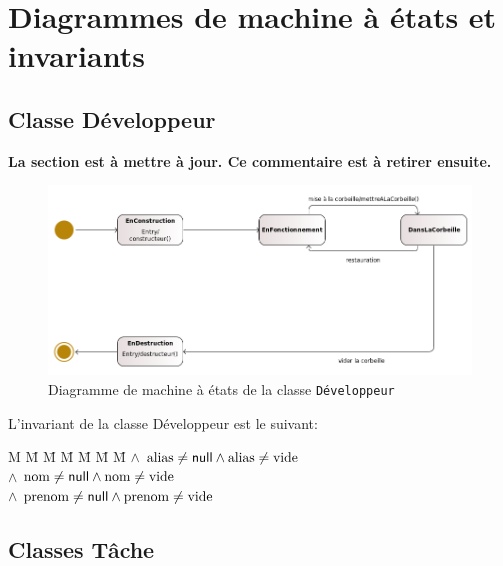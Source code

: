 \documentclass[11pt,article]{article}
\newcommand{\nullvalue}{\textsf{null}\xspace}
\begin{document}
\newpage

\section{Diagrammes de machine à états et invariants}

\subsection{Classe \textsf{Développeur}}

{\noindent\color{red}\textbf{La section est à mettre à jour. Ce
    commentaire est à retirer ensuite.}}

\begin{figure}[ht!]
\begin{center}
\includegraphics[scale=0.5]{./Diagrammes/suipro_uml_diag_machine_a_etats_developpeur}
\caption{Diagramme de machine à états de la classe \texttt{Développeur}}
\end{center}
\label{umlet_diag_machine_a_etats_developpeur}
\end{figure}

\newcommand{\emptystring}{\ensuremath\mathrm{vide}}
\newcommand{\alias}{\ensuremath\mathrm{alias}}
\newcommand{\nom}{\ensuremath\mathrm{nom}}
\newcommand{\prenom}{\ensuremath\mathrm{prenom}}
L'invariant de la classe \textsf{Développeur} est le suivant:
\begin{tabbing}
M \= M \= M \= M \= M \= M \= M \kill
\> $\land$ \> $\alias \neq \nullvalue \land \alias \neq \emptystring$\\
\> $\land$ \> $\nom \neq \nullvalue \land \nom \neq \emptystring$\\
\> $\land$ \> $\prenom \neq \nullvalue \land \prenom \neq \emptystring$\\
\end{tabbing}

\newpage

\subsection{Classes \textsf{Tâche}}
\end{document}
